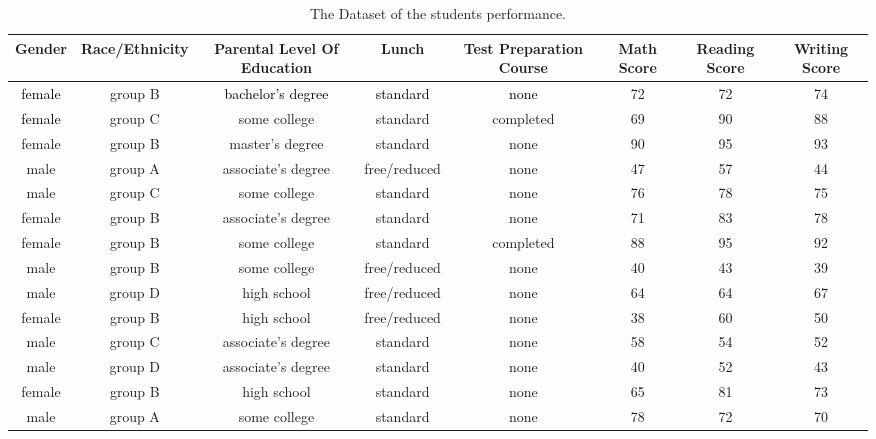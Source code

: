 \documentclass{article}
\begin{document}
	
	
	\begin{sidewaystable}[h!]
		\begin{center}
			\caption{The Dataset of the students performance.}
			\label{tab:Table}
			\begin{tiny}
			\begin{tabular}{|S|S|S|S|S|S|S|S|}
				\hline 
				\textbf{}\textcolor{white!25}{\textbf{Gender}} & \textcolor{white!25}{\textbf{Race/Ethnicity}} & \textbf{}\textcolor{white!25}{\textbf{Parental Level Of Education}} & \textcolor{white!25}{\textbf{Lunch}} & \textbf{}\textcolor{white!25}{\textbf{Test Preparation Course}}& \textbf{}\textcolor{white!25}{\textbf{Math Score}}&\textbf{}\textcolor{white!25}{\textbf{Reading Score}} &\textbf{}\textcolor{white!25}{\textbf{Writing Score}}\\
				\hline
				\textcolor{black}{female} & {group B} & \textcolor{black}{bachelor's degree} & \textcolor{black}{standard} & \textcolor{black}{none} & 72 & 72 & 74\\
				\hline
				\textcolor{black}{female} & {group C} & {some college} & {standard} & {completed} & 69 & 90 & 88\\
				\hline
				{female} & {group B} & {master's degree} & {standard} & {none} & 90 & 95 & 93\\
				\hline
				{male} & {group A} & {associate's degree} & {free/reduced} & {none} & 47 & 57 & 44\\
				\hline
				{male} & {group C} & {some college} & {standard} & {none} & 76 & 78 & 75\\
				\hline
				{female} & {group B} & {associate's degree} & {standard} & {none} & 71 & 83 & 78\\
				\hline
				{female} & {group B} & {some college} & {standard} & {completed} & 88 & 95 & 92\\
				\hline
				{male} & {group B}& {some college} & {free/reduced} & {none} & 40 & 43 & 39\\
				\hline
				{male} & {group D} & {high school} & {free/reduced} & {none} & 64 & 64 & 67\\
				\hline
				{female} & {group B} & {high school} & {free/reduced} & {none} & 38 & 60 & 50\\
				\hline
				{male} & {group C} & {associate's degree} & {standard} & {none} & 58 & 54 & 52\\
				\hline
				{male} & {group D} & {associate's degree} & {standard} & {none} & 40 & 52 & 43\\
				\hline
				{female} & {group B} & {high school} & {standard} & {none} & 65 & 81 & 73\\
				\hline
				{male} & {group A} & {some college} & {standard} & {none} & 78 & 72 & 70\\
				\hline
			\end{tabular}
		 \end{tiny}
		\end{center}
	\end{sidewaystable}
	
\end{document}

